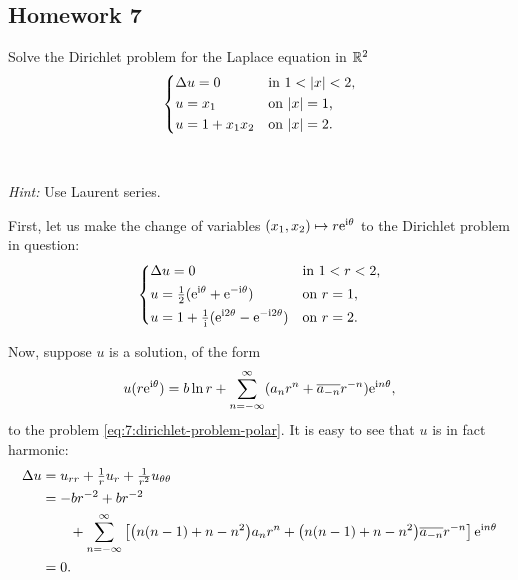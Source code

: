 \subsection{Homework 7}
\begin{problem}
  Solve the Dirichlet problem for the Laplace equation in \(\mathbb{R}^2\)
  \[
    \left\{
      \begin{aligned}
        &\Lap u=0&&\text{in \(1<|x|<2\),}\\
        &u=x_1&&\text{on \(|x|=1\),}\\
        &u=1+x_1x_2&&\text{on \(|x|=2\).}
      \end{aligned}
    \right.
  \]
  \\\\
  \emph{Hint:} Use Laurent series.
\end{problem}
\begin{solution*}
  First, let us make the change of variables \((x_1,x_2)\mapsto
  r\mathrm{e}^{\mathrm{i}\theta}\) to the Dirichlet problem in question:
  \begin{equation}
    \label{eq:7:dirichlet-problem-polar}
    \left\{
      \begin{aligned}
        &\Delta u=0&&\text{in \(1<r<2\),}\\
        &u=\tfrac{1}{2}(\mathrm{e}^{\mathrm{i}\theta}+\mathrm{e}^{-\mathrm{i}\theta})&&\text{on \(r=1\),}\\
        &u=1+\tfrac{1}{\mathrm{i}}(\mathrm{e}^{\mathrm{i} 2\theta}-\mathrm{e}^{-\mathrm{i}
          2\theta})&&\text{on \(r=2\).}
      \end{aligned}
    \right.
  \end{equation}

  Now, suppose \(u\) is a solution, of the form
  \[
    u(r\rme^{\rmi\theta})=%
    b\ln r%
    +\sum_{n=-\infty}^\infty (a_nr^n+\overline{a_{-n}}r^{-n})\rme^{\rmi n\theta},
  \]
  to the problem \eqref{eq:7:dirichlet-problem-polar}. It is easy to see
  that \(u\) is in fact harmonic:
  \begin{align*}
    \Lap u%
    &=u_{rr}+\tfrac{1}{r}u_r+\tfrac{1}{r^2}u_{\theta\theta}\\
    &=-br^{-2}+br^{-2}\\
    &\qquad+\sum_{n=-\infty}^\infty
      \left[\bigl(n(n-1)+n-n^2\bigr) a_nr^n
      +\bigl(n(n-1)+n-n^2\bigr)\overline{a_{-n}}r^{-n}\right]\rme^{\rmi
      n\theta}\\
    &=0.
  \end{align*}


\end{solution*}
